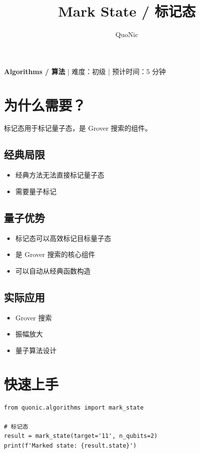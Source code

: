 \documentclass[12pt,a4paper]{article}
\title{Mark State / 标记态}
\author{QuoNic}
\date{}
\begin{document}
\maketitle

\begin{center}
\textbf{Algorithms / 算法} | 难度：初级 | 预计时间：5 分钟
\end{center}

\tableofcontents
\newpage

\section{为什么需要？}

标记态用于标记量子态，是 Grover 搜索的组件。

\subsection{经典局限}
\begin{itemize}
  \item 经典方法无法直接标记量子态
  \item 需要量子标记
\end{itemize}

\subsection{量子优势}
\begin{itemize}
  \item 标记态可以高效标记目标量子态
  \item 是 Grover 搜索的核心组件
  \item 可以自动从经典函数构造
\end{itemize}

\subsection{实际应用}
\begin{itemize}
  \item Grover 搜索
  \item 振幅放大
  \item 量子算法设计
\end{itemize}

\section{快速上手}

\begin{verbatim}
from quonic.algorithms import mark_state

# 标记态
result = mark_state(target='11', n_qubits=2)
print(f'Marked state: {result.state}')
\end{verbatim}
\end{document}
